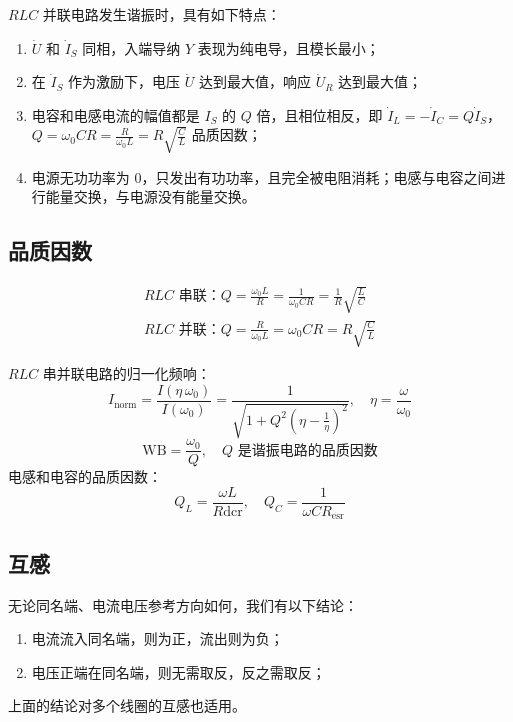 \documentclass[a4paper]{article}  %
\theoremstyle{MyLineTheoremStyle} %
\theoremstyle{MyBlockTheoremStyle} %
\theoremstyle{MySubsubsectionStyle} %
\begin{document}
\begin{multicols*}{4}
$RLC$ 并联电路发生谐振时，具有如下特点：
\begin{enumerate}
\item $\dot{U}$ 和 $\dot{I}_S$ 同相，入端导纳 $Y$ 表现为纯电导，且模长最小；
\item 在 $\dot{I}_S$ 作为激励下，电压 $\dot{U}$ 达到最大值，响应 $\dot{U}_R$ 达到最大值；
\item 电容和电感电流的幅值都是 $I_S$ 的 $Q$ 倍，且相位相反，即 $\dot{I}_L = -\dot{I}_C = Q \dot{I}_S$，$Q = \omega_0 C R = \frac{R}{\omega_0 L} = R\sqrt{\frac{C}{L}}$ 品质因数；
\item 电源无功功率为 0，只发出有功功率，且完全被电阻消耗；电感与电容之间进行能量交换，与电源没有能量交换。
\end{enumerate}

\subsection{品质因数}
\begin{gather}
RLC \text{\ 串联：} Q = \frac{\omega_0 L}{R} = \frac{1}{\omega_0 CR} = \frac{1}{R}\sqrt{\frac{L}{C}} \\ 
RLC \text{\ 并联：} Q = \frac{R}{\omega_0 L} = \omega_0 C R =  R\sqrt{\frac{C}{L}}
\end{gather}

$RLC$ 串并联电路的归一化频响：
\begin{equation}
I_\text{norm} = \frac{I(\eta \, \omega_0)}{I(\omega_0)} = \frac{1}{\sqrt{ 1 + Q^2 \left(\eta - \frac{1}{\eta}\right)^2 }},\quad \eta = \frac{\omega}{\omega_0}
\end{equation}
\begin{equation}
\text{WB} = \frac{\omega_0}{Q},\quad \text{$Q$ 是谐振电路的品质因数}
\end{equation}
电感和电容的品质因数：
\begin{equation}
Q_L = \frac{\omega L}{R\text{dcr}},\quad 
Q_C = \frac{1}{\omega C R_{\text{esr}}}
\end{equation}



\subsection{互感}

无论同名端、电流电压参考方向如何，我们有以下结论：
\begin{enumerate}
\item 电流流入同名端，则为正，流出则为负；
\item 电压正端在同名端，则无需取反，反之需取反；
\end{enumerate}
上面的结论对多个线圈的互感也适用。


\end{multicols*}
\end{document}
